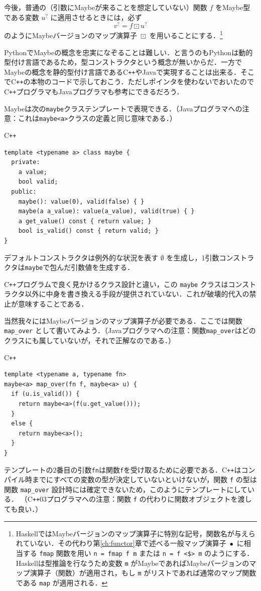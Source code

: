 \documentclass[a4paper]{jsbook}
\newcommand{\programminglanguage}[1]{\textsf{#1}}
\newcommand{\cxx}{\programminglanguage{C}\texttt{++}}
\newcommand{\cxxzerothree}{\cxx\programminglanguage{03}}
\newcommand{\haskell}{\programminglanguage{Haskell}}
\newcommand{\java}{\programminglanguage{Java}}
\newcommand{\python}{\programminglanguage{Python}}
\newcommand{\code}[1]{\texttt{#1}}
\newenvironment{cxxcode}{\begin{itembox}[r]{\cxx}}{\end{itembox}}
\newcommand{\mNothing}{\emptyset}
\newcommand{\mMaybe}[1]{{#1}^\text{?}}
\DeclareMathOperator{\mMap}{\bullet}
\DeclareMathOperator{\mMapMaybe}{\boxdot}
\begin{document}
今後，普通の（引数にMaybeが来ることを想定していない）関数 $f$ をMaybe型である変数 $\mMaybe{u}$ に適用させるときには，必ず
\begin{equation}
\mMaybe{v}=f\mMapMaybe\mMaybe{u}
\end{equation}
のようにMaybeバージョンのマップ演算子 $\mMapMaybe$ を用いることにする．\footnote{\haskell ではMaybeバージョンのマップ演算子に特別な記号，関数名が与えられていない．その代わり第\ref{ch:functor}章で述べる一般マップ演算子 $\mMap$ に相当する \code{fmap} 関数を用い \code{n = fmap f m} または \code{n = f <\$> m} のようにする．\haskell は型推論を行なうため変数 \code{m} がMaybeであればMaybeバージョンのマップ演算子（関数）が適用され，もし \code{m} がリストであれば通常のマップ関数である \code{map} が適用される．}

\python でMaybeの概念を忠実になぞることは難しい．と言うのも\python は動的型付け言語であるため，型コンストラクタという概念が無いからだ．一方でMaybeの概念を静的型付け言語である\cxx や\java で実現することは出来る．そこで\cxx の本物のコードで示しておこう．ただしポインタを使わないでおいたので\cxx プログラマも\java プログラマも参考にできるだろう．

Maybeは次の\code{maybe}クラステンプレートで表現できる．（\java プログラマへの注意：これは\code{maybe<a>}クラスの定義と同じ意味である．）
\begin{cxxcode}
\begin{verbatim}
template <typename a> class maybe {
  private:
    a value;
    bool valid;
  public:
    maybe(): value(0), valid(false) { }
    maybe(a a_value): value(a_value), valid(true) { }
    a get_value() const { return value; }
    bool is_valid() const { return valid; }
}
\end{verbatim}
\end{cxxcode}
デフォルトコンストラクタは例外的な状況を表す $\mNothing$ を生成し，1引数コンストラクタは\code{maybe}で包んだ引数値を生成する．

\cxx プログラムで良く見かけるクラス設計と違い，この \code{maybe} クラスはコンストラクタ以外に中身を書き換える手段が提供されていない．これが破壊的代入の禁止が意味することである．

当然我々にはMaybeバージョンのマップ演算子が必要である．ここでは関数 \code{map\_over} として書いてみよう．（\java プログラマへの注意：関数\code{map\_over}はどのクラスにも属していないが，それで正解なのである．）
\begin{cxxcode}
\begin{verbatim}
template <typename a, typename fn>
maybe<a> map_over(fn f, maybe<a> u) {
  if (u.is_valid()) {
    return maybe<a>(f(u.get_value()));
  }
  else {
    return maybe<a>();
  }
}
\end{verbatim}
\end{cxxcode}
テンプレートの2番目の引数\code{fn}は関数\code{f}を受け取るために必要である．\cxx はコンパイル時までにすべての変数の型が決定していないといけないが，関数 \code{f} の型は関数 \code{map\_over} 設計時には確定できないため，このようにテンプレートにしている．
（\cxxzerothree プログラマへの注意：関数 \code{f} の代わりに関数オブジェクトを渡しても良い．）
\end{document}
